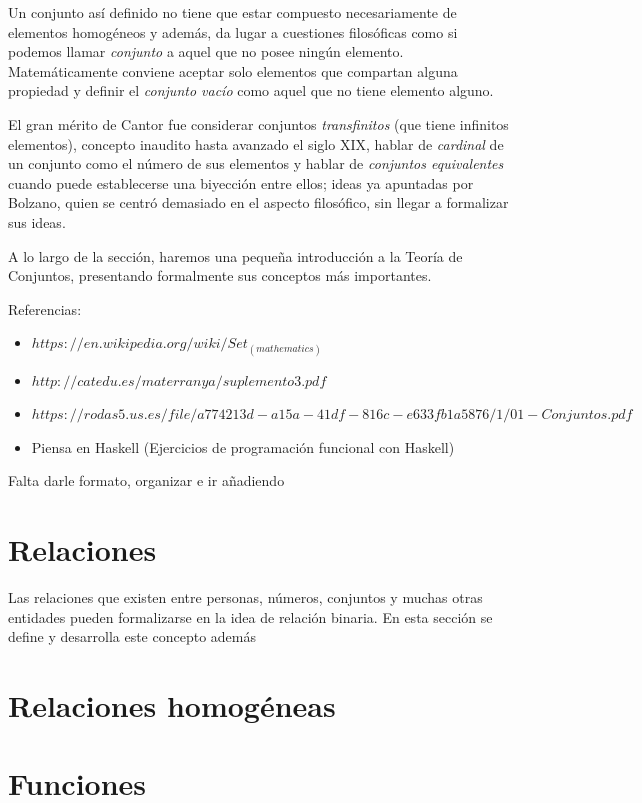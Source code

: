 Un conjunto así definido no tiene que estar compuesto necesariamente
de elementos homogéneos y además, da lugar a cuestiones filosóficas como 
si podemos llamar \textit{conjunto} a aquel que no posee ningún elemento. 
Matemáticamente conviene aceptar solo elementos que compartan alguna 
propiedad y definir el \textit{conjunto vacío} como aquel que no tiene 
elemento alguno.

El gran mérito de Cantor fue considerar conjuntos \textit{transfinitos} 
(que tiene infinitos elementos), concepto inaudito hasta avanzado el siglo 
XIX, hablar de \textit{cardinal} de un conjunto como el número de sus
elementos y hablar de \textit{conjuntos equivalentes} cuando puede
establecerse una biyección entre ellos; ideas ya apuntadas por Bolzano,
quien se centró demasiado en el aspecto filosófico, sin llegar a formalizar
sus ideas.

A lo largo de la sección, haremos una pequeña introducción a la Teoría de 
Conjuntos, presentando formalmente sus conceptos más importantes.

\begin{comentario}
Referencias:
\begin{itemize}
  \item $https://en.wikipedia.org/wiki/Set_(mathematics)$
  \item $http://catedu.es/materranya/suplemento3.pdf$
  \item $https://rodas5.us.es/file/a774213d-a15a-41df-816c-e633fb1a5876/1/01-Conjuntos.pdf$
  \item Piensa en Haskell (Ejercicios de programación funcional con Haskell)
\end{itemize}

Falta darle formato, organizar e ir añadiendo
\end{comentario}


\section{Relaciones}

Las relaciones que existen entre personas, números, conjuntos y muchas
otras entidades pueden formalizarse en la idea de relación binaria. En esta 
sección se define y desarrolla este concepto además 


\section{Relaciones homogéneas}


\section{Funciones}


